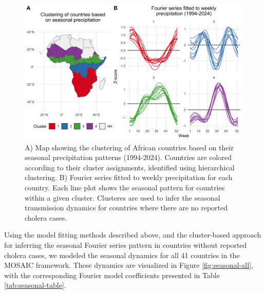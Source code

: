 \documentclass[
]{book}
\begin{document}
\begin{figure}

{\centering \includegraphics[width=1\linewidth]{figures/seasonal_precip_hierarchical_cluster} 

}

\caption{A) Map showing the clustering of African countries based on their seasonal precipitation patterns (1994-2024). Countries are colored according to their cluster assignments, identified using hierarchical clustering. B) Fourier series fitted to weekly precipitation for each country. Each line plot shows the seasonal pattern for countries within a given cluster. Clusteres are used to infer the seasonal transmission dynamics for countries where there are no reported cholera cases.}\label{fig:seasonal-cluster}
\end{figure}

Using the model fitting methods described above, and the cluster-based approach for inferring the seasonal Fourier series pattern in countries without reported cholera cases, we modeled the seasonal dynamics for all 41 countries in the MOSAIC framework. These dynamics are visualized in Figure \ref{fig:seasonal-all}, with the corresponding Fourier model coefficients presented in Table \ref{tab:seasonal-table}.
\end{document}
